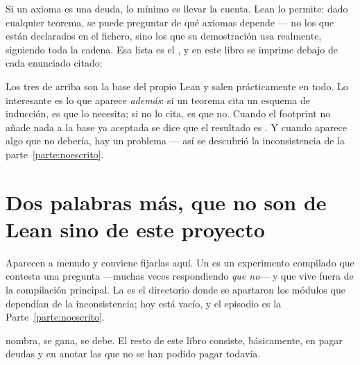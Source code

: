 Si un axioma es una deuda, lo mínimo es llevar la cuenta. Lean lo permite: dado cualquier teorema,
se puede preguntar de qué axiomas depende — no los que están declarados en el fichero, sino los que
su demostración usa realmente, siguiendo toda la cadena. Esa lista es el , y en
este libro se imprime debajo de cada enunciado citado:


\begin{leccion}
Los tres de arriba son la base del propio Lean y salen prácticamente en todo. Lo interesante es lo
que aparece \emph{además}: si un teorema cita un esquema de inducción, es que lo necesita; si no lo
cita, es que no. Cuando el footprint no añade nada a la base ya aceptada se dice que el resultado es
. Y cuando aparece algo que no debería, hay un problema — así se descubrió la
inconsistencia de la parte~\ref{parte:noescrito}.
\end{leccion}

\section{Dos palabras más, que no son de Lean sino de este proyecto}

Aparecen a menudo y conviene fijarlas aquí. Un  es un experimento compilado que
contesta una pregunta —muchas veces respondiendo \emph{que no}— y que vive fuera de la compilación
principal. La  es el directorio donde se apartaron los módulos que dependían de
la inconsistencia; hoy está vacío, y el episodio es la Parte~\ref{parte:noescrito}.

\begin{leccion}
 nombra,  se gana,  se debe. El resto de este libro consiste,
básicamente, en pagar deudas y en anotar las que no se han podido pagar todavía.
\end{leccion}
